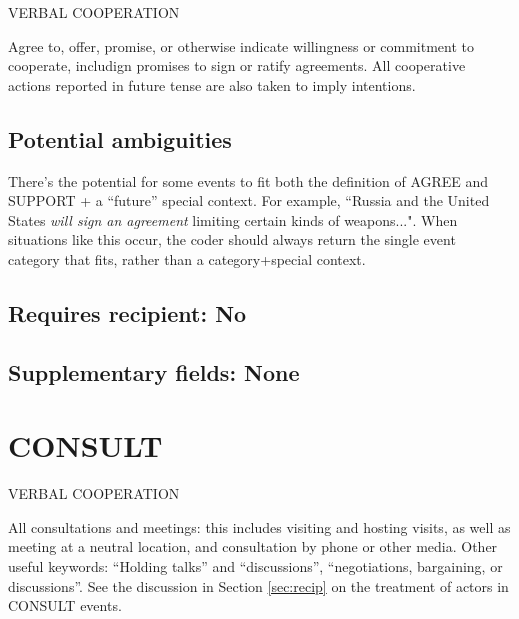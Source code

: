 \documentclass[11pt]{report}
\newcommand{\plcat}[1]{\textsf{#1}}
\begin{document}
\textsf{VERBAL COOPERATION} \vspace{8pt}

Agree to, offer, promise, or otherwise indicate willingness or commitment to cooperate, includign promises to sign or ratify agreements.  All cooperative actions reported in future tense are also taken to imply intentions. 

\begin{comment}
pas 2018-01-06

As I'm going through a lot of GSRs, I'm beginning to wonder whether we should combine AGREE and SUPPORT: it's not really clear to me whether the boundary is between them. This would continue a consolidation of the various WEIS verbal categories -- e.g. AGREE/PROMISE, WARNING/THREAT -- that we initiated with CAMEO.
\end{comment}

\subsection{Potential ambiguities}

There's the potential for some events to fit both the definition of \plcat{AGREE} and \plcat{SUPPORT} + a ``future'' special context. For example, ``Russia and the United States \emph{will sign an agreement} limiting certain kinds of weapons...". When situations like this occur, the coder should always return the single event category that fits, rather than a category+special context.

\subsection{Requires recipient: No}

\subsection{Supplementary fields: None}

\bigskip  

\section{CONSULT}

\textsf{VERBAL COOPERATION} \vspace{8pt}

All consultations and meetings: this includes visiting and hosting visits, as well as meeting at a neutral location, and consultation by phone or other media. Other useful keywords: ``Holding talks'' and ``discussions'', ``negotiations, bargaining, or discussions''. See the discussion in Section \ref{sec:recip} on the treatment of actors in \plcat{CONSULT} events.
\end{document}
